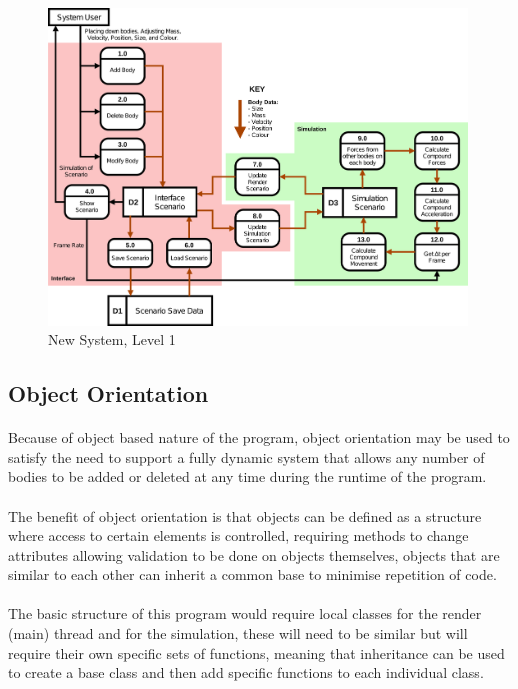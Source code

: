 \begin{figure}[!ht]
  \centering
  \includegraphics[angle=-90, width=0.99\textwidth]{img/nsl1.png}
  \caption{New System, Level 1}
\end{figure}

\subsection{Object Orientation}
\paragraph{}
Because of object based nature of the program, object orientation may be used to satisfy the need to support a fully dynamic system that allows any number of bodies to be added or deleted at any time during the runtime of the program.

\paragraph{}
The benefit of object orientation is that objects can be defined as a structure where access to certain elements is controlled, requiring methods to change attributes allowing validation to be done on objects themselves, objects that are similar to each other can inherit a common base to minimise repetition of code.

\paragraph{}
The basic structure of this program would require local classes for the render (main) thread and for the simulation, these will need to be similar but will require their own specific sets of functions, meaning that inheritance can be used to create a base class and then add specific functions to each individual class.

